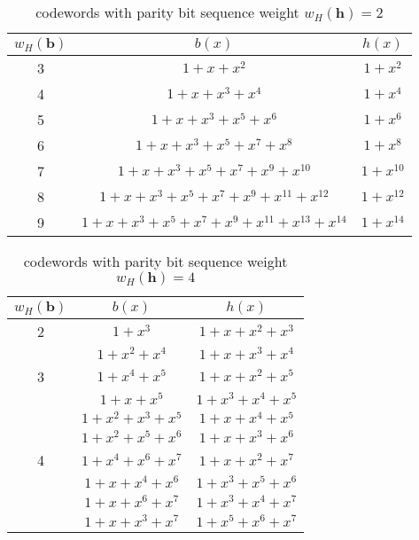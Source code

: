  
    \begin{table*}[h]
 
 \caption{codewords with parity bit sequence weight $w_H(\textbf{h})=2$}
\centering
 \begin{tabular}{c c c} 
 \hline
 $w_H(\textbf{b})$ & $b(x)$ & $h(x)$ \\ [0.5ex] 
 \hline\hline
 3 &  $1+x+x^2$ & $1+x^2$\\ 
 4 & $1+x+x^3+x^4$ & $1+x^4$ \\
 5 & $1+x+x^3+x^5+x^6$ & $1+x^6$ \\
 6 & $1+x+x^3+x^5+x^7+x^8$& $1+x^8$ \\
 7 & $1+x+x^3+x^5+x^7+x^9+x^{10}$ & $1+x^{10}$ \\
 8 & $1+x+x^3+x^5+x^7+x^9+x^{11}+x^{12}$ & $1+x^{12}$\\ 
 9 & $1+x+x^3+x^5+x^7+x^9+x^{11}+x^{13}+x^{14}$ & $1+x^{14}$ \\ [1ex] 
 \hline
 \end{tabular}
 \label{tab1}
\end{table*}
 
 \begin{table*}[h!]
 
 \caption{codewords with parity bit sequence weight $w_H(\textbf{h})=4$}
\centering
 \begin{tabular}{c c c} 
 \hline
 $w_H(\textbf{b})$ & $b(x)$ & $h(x)$ \\ [0.5ex] 
 \hline\hline
 2 &  $1+x^3$ & $1+x+x^2+x^3$\\ 
 \hline 
  & $1+x^2+x^4$ &  $1+x+x^3+x^4$ \\
   3 &  $1+x^4+x^5$ & $1+x+x^2+x^5$ \\
  &  $1+x+x^5$ & $1+x^3+x^4+x^5$ \\
  \hline 
  & $1+x^2+x^3+x^5$ & $1+x+x^4+x^5$ \\
  &  $1+x^2+x^5+x^6$ & $1+x+x^3+x^6$ \\
 4 & $1+x^4+x^6+x^7$ & $1+x+x^2+x^7$\\ 
  &  $1+x+x^4+x^6$ & $1+x^{3}+x^5+x^6$ \\ 
  &  $1+x+x^6+x^7$ & $1+x^{3}+x^4+x^7$ \\  
  &  $1+x+x^3+x^7$ & $1+x^5+x^6+x^7$ \\ 
 [1ex]
 \hline
 \end{tabular}
 \label{tab2}
\end{table*}

